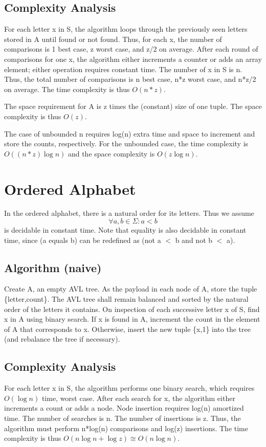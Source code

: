\documentclass{article}
\begin{document}
\begin{multicols}{2}
\subsection{Complexity Analysis}
For each letter x in S, the algorithm loops through the previously seen letters stored in A until found or not found.
Thus, for each x, the number of comparisons is 1 best case, z worst case, and z/2 on average.
After each round of comparisons for one x, the algorithm either increments a counter or adds an array element; 
either operation requires constant time.
The number of x in S is n. 
Thus, the total number of comparisons is n best case, n*z worst case, and n*z/2 on average.
The time complexity is thus $O(n*z)$.

The space requirement for A is z times the (constant) size of one tuple.
The space complexity is thus $O(z)$.

The case of unbounded n requires log(n) extra time and space to increment and store the counts, respectively.
For the unbounded case, the time complexity is $O((n*z)\log{}n)$ and the space complexity is $O(z\log{}n)$.
\section{Ordered Alphabet}
In the ordered alphabet, there is a natural order for its letters.
Thus we assume
\begin{equation*}
    \forall a,b  \in \Sigma : a < b 
\end{equation*}
is decidable in constant time. 
Note that equality is also decidable in constant time, since (a equals b) can be redefined as (not a $<$ b and not b $<$ a).
\subsection{Algorithm (naive)}
Create A, an empty AVL tree.
As the payload in each node of A, store the tuple \{letter,count\}.
The AVL tree shall remain balanced and sorted by the natural order of the letters it contains.
On inspection of each successive letter x of S, find x in A using binary search.
If x is found in A, increment the count in the element of A that corresponds to x.
Otherwise, insert the new tuple \{x,1\} into the tree (and rebalance the tree if necessary).
\subsection{Complexity Analysis}
For each letter x in S, the algorithm performs one binary search, which requires $O(\log{}n)$ time, worst case.
After each search for x, the algorithm either increments a count or adds a node.
Node insertion requires log(n) amortized time.
The number of searches is n.
The number of insertions is z.
Thus, the algorithm must perform n*log(n) comparisons and log(z) insertions.
The time complexity is thus $O(n\log{}n+\log{}z) \cong O(n\log{}n)$.


\end{multicols}
\end{document}
